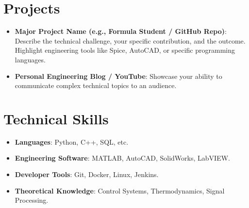 \documentclass[letterpaper,11pt]{article}
\newcommand{\resumeItem}[2]{
  \item\small{
    \textbf{#1}{: #2 \vspace{-2pt}}
  }
}
\newcommand{\resumeSubHeadingListStart}{\begin{itemize}[leftmargin=*]}
\newcommand{\resumeSubHeadingListEnd}{\end{itemize}}
\begin{document}
\section{Projects}
  \resumeSubHeadingListStart
    \resumeItem{Major Project Name (e.g., Formula Student / GitHub Repo)}
      {Describe the technical challenge, your specific contribution, and the outcome. Highlight engineering tools like Spice, AutoCAD, or specific programming languages.}
    \resumeItem{Personal Engineering Blog / YouTube}
      {Showcase your ability to communicate complex technical topics to an audience.}
  \resumeSubHeadingListEnd

\section{Technical Skills}
 \resumeSubHeadingListStart
   \item{\textbf{Languages}{: Python, C++, SQL, etc.}}
   \item{\textbf{Engineering Software}{: MATLAB, AutoCAD, SolidWorks, LabVIEW.}}
   \item{\textbf{Developer Tools}{: Git, Docker, Linux, Jenkins.}}
   \item{\textbf{Theoretical Knowledge}{: Control Systems, Thermodynamics, Signal Processing.}}
 \resumeSubHeadingListEnd
\end{document}
